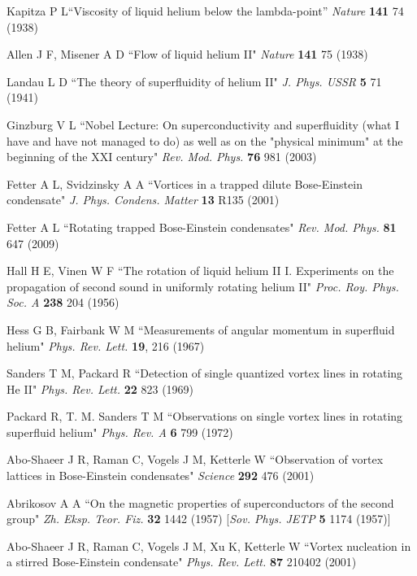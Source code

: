 \documentclass[pra,letterpaper,twocolumn,showpacs,superscriptaddress]{revtex4}
\begin{document}
\begin{thebibliography}{300}

 Kapitza P L``Viscosity of liquid helium below the lambda-point'' {\it Nature} \textbf{141} 74 (1938)

 Allen J F, Misener A D ``Flow of liquid helium II" {\it Nature} \textbf{141} 75 (1938)

 Landau L D ``The theory of superfluidity of helium II" {\it J. Phys. USSR} \textbf{5} 71 (1941)

 Ginzburg V L ``Nobel Lecture: On superconductivity and superfluidity (what I have and have not managed to do) 
as well as on the "physical minimum" at the beginning of the XXI century"
{\it Rev. Mod. Phys.} \textbf{76} 981 (2003)

 Fetter A L, Svidzinsky A A ``Vortices in a trapped dilute Bose-Einstein condensate"
{\it J. Phys. Condens. Matter} \textbf{13} R135 (2001)

 Fetter A L ``Rotating trapped Bose-Einstein condensates" {\it Rev. Mod. Phys.} \textbf{81} 647 (2009)

 Hall H E, Vinen W F 
``The rotation of liquid helium II I. Experiments on the propagation of second sound in uniformly rotating helium II"
{\it Proc. Roy. Phys. Soc. A}  {\bf 238} 204 (1956)

 Hess G B, Fairbank W M
``Measurements of angular momentum in superfluid helium"
{\it Phys. Rev. Lett.} \textbf{19}, 216 (1967)

 Sanders T M, Packard R ``Detection of single quantized vortex lines in rotating He II"
{\it Phys. Rev. Lett.} \textbf{22} 823 (1969)

 Packard R, T. M. Sanders T M ``Observations on single vortex lines in rotating superfluid helium"
{\it Phys. Rev. A} \textbf{6} 799 (1972)

 Abo-Shaeer J R, Raman C, Vogels J M,  Ketterle W ``Observation of vortex lattices in Bose-Einstein condensates" 
{\it Science} \textbf{292} 476 (2001)

 Abrikosov A A ``On the magnetic properties of superconductors of the second group"
{\it Zh. Eksp. Teor. Fiz.} \textbf{32} 1442 (1957) [{\it Sov. Phys. JETP} \textbf{5} 1174 (1957)]

 Abo-Shaeer J R, Raman C, Vogels J M, Xu K, Ketterle W ``Vortex nucleation in a stirred Bose-Einstein condensate" 
{\it Phys. Rev. Lett.} \textbf{87} 210402 (2001)


\end{thebibliography}
\end{document}
